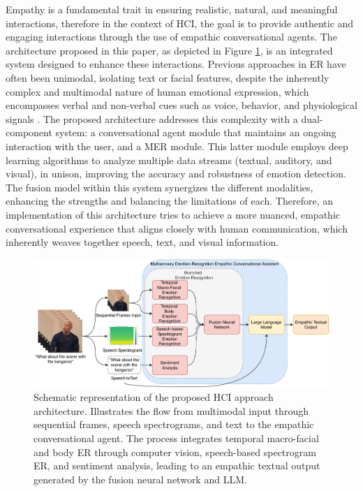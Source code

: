 \documentclass[runningheads]{llncs}
\begin{document}
Empathy is a fundamental trait in ensuring realistic, natural, and meaningful interactions, therefore in the context of HCI, the goal is to provide authentic and engaging interactions through the use of empathic conversational agents. The architecture proposed in this paper, as depicted in Figure \ref{fig:approachArchitecture}, is an integrated system designed to enhance these interactions. Previous approaches in ER have often been unimodal, isolating text or facial features, despite the inherently complex and multimodal nature of human emotional expression, which encompasses verbal and non-verbal cues such as voice, behavior, and physiological signals \cite{ezzameli_emotion_2023, zhu_multimodal_2023}. The proposed architecture addresses this complexity with a dual-component system: a conversational agent module that maintains an ongoing interaction with the user, and a MER module. This latter module employs deep learning algorithms to analyze multiple data streams (textual, auditory, and visual), in unison, improving the accuracy and robustness of emotion detection. The fusion model within this system synergizes the different modalities, enhancing the strengths and balancing the limitations of each. Therefore, an implementation of this architecture tries to achieve a more nuanced, empathic conversational experience that aligns closely with human communication, which inherently weaves together speech, text, and visual information.

\begin{figure}[htb]
	\centering
	\includegraphics[width=0.97\linewidth]{approachArchitecture.pdf}
	\caption{Schematic representation of the proposed HCI approach architecture. Illustrates the flow from multimodal input through sequential frames, speech spectrograms, and text to the empathic conversational agent. The process integrates temporal macro-facial and body ER through computer vision, speech-based spectrogram ER, and sentiment analysis, leading to an empathic textual output generated by the fusion neural network and LLM.}
	\label{fig:approachArchitecture}
\end{figure}
\end{document}
